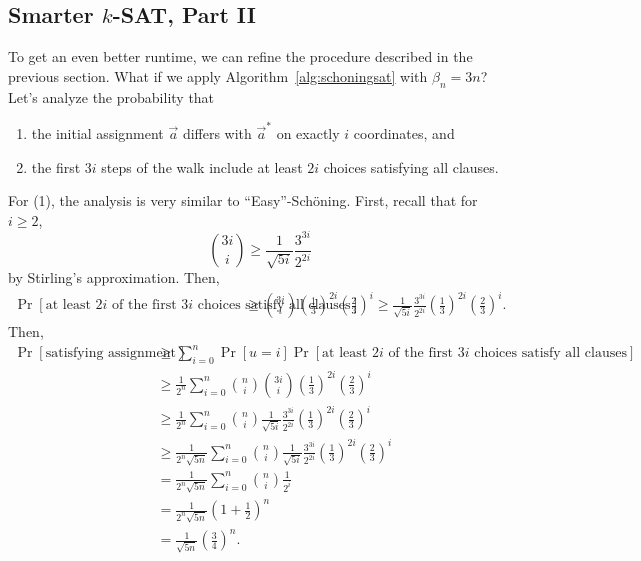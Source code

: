     \subsection{Smarter \(k\)-SAT, Part II}

        To get an even better runtime, we can refine the procedure described in the previous section. What if we apply Algorithm~\ref{alg:schoningsat} with \(\beta_n=3n\)? Let's analyze the probability that 
        \begin{enumerate}
            \item the initial assignment \(\vec{a}\) differs with \(\vec{a}^*\) on exactly \(i\) coordinates, and
            \item the first \(3i\) steps of the walk include at least \(2i\) choices satisfying all clauses.
        \end{enumerate}
        For (1), the analysis is very similar to ``Easy''-Sch\"oning. First, recall that for \(i\geq 2\),
        \begin{equation*}
            \binom{3i}{i}\geq \frac{1}{\sqrt{5i}}\frac{3^{3i}}{2^{2i}}
        \end{equation*}
        by Stirling's approximation. Then,
        \begin{align*}
            \Pr[\text{at least }2i\text{ of the first }3i\text{ choices satisfy all clauses}]&\geq\binom{3i}{i}\left(\frac{1}{3}\right)^{2i}\left(\frac{2}{3}\right)^i\geq \frac{1}{\sqrt{5i}}\frac{3^{3i}}{2^{2i}}  \left(\frac{1}{3}\right)^{2i}\left(\frac{2}{3}\right)^i.
        \end{align*}
        Then,
        \begin{align*}
            \Pr[\text{satisfying assignment found}]&\geq \sum_{i=0}^n\Pr[u=i]\Pr[\text{at least }2i\text{ of the first }3i\text{ choices satisfy all clauses}] \\
            &\geq \frac{1}{2^n}\sum_{i=0}^n \binom{n}{i}\binom{3i}{i}  \left(\frac{1}{3}\right)^{2i}\left(\frac{2}{3}\right)^i \\
            &\geq \frac{1}{2^n}\sum_{i=0}^n \binom{n}{i}\frac{1}{\sqrt{5i}}\frac{3^{3i}}{2^{2i}}  \left(\frac{1}{3}\right)^{2i}\left(\frac{2}{3}\right)^i \\
            &\geq \frac{1}{2^n\sqrt{5n}}\sum_{i=0}^n\binom{n}{i}\frac{1}{\sqrt{5i}}\frac{3^{3i}}{2^{2i}}  \left(\frac{1}{3}\right)^{2i}\left(\frac{2}{3}\right)^i \\
            &=\frac{1}{2^n\sqrt{5n}}\sum_{i=0}^n\binom{n}{i}\frac{1}{2^i} \\
            &=\frac{1}{2^n\sqrt{5n}}\left(1+\frac{1}{2}\right)^n \\
            &=\frac{1}{\sqrt{5n}}\left(\frac{3}{4}\right)^n.
        \end{align*}
